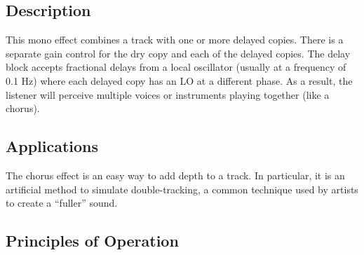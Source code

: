 \subsection{Description}
This mono effect combines a track with one or more delayed copies. There is a separate gain control for the dry copy and each of the delayed copies. The delay block accepts fractional delays from a local oscillator (usually at a frequency of 0.1 Hz) where each delayed copy has an LO at a different phase. As a result, the listener will perceive multiple voices or instruments playing together (like a chorus).

\subsection{Applications}
The chorus effect is an easy way to add depth to a track. In particular, it is an artificial method to simulate double-tracking, a common technique used by artists to create a ``fuller'' sound.

\subsection{Principles of Operation}

